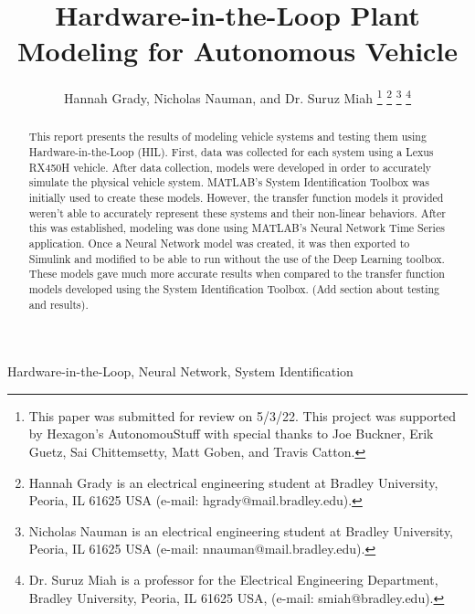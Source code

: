 \documentclass[journal,twoside,web]{ieeecolor}
\begin{document}
\title{Hardware-in-the-Loop Plant Modeling for Autonomous Vehicle}
\author{Hannah Grady, Nicholas Nauman, and Dr. Suruz Miah
\thanks{This paper was submitted for review on 5/3/22. This project was supported by Hexagon's AutonomouStuff with special thanks to Joe Buckner, Erik Guetz, Sai Chittemsetty, Matt Goben, and Travis Catton.}
\thanks{Hannah Grady is an electrical engineering student at Bradley University, Peoria, IL 61625 USA (e-mail: hgrady@mail.bradley.edu).}
\thanks{Nicholas Nauman is an electrical engineering student at Bradley University, Peoria, IL 61625 USA (e-mail: nnauman@mail.bradley.edu).}
\thanks{Dr. Suruz Miah is a professor for the Electrical Engineering Department, Bradley University, Peoria, IL 
61625 USA, (e-mail: smiah@bradley.edu).}
}

\maketitle

\begin{abstract}
This report presents the results of modeling vehicle systems and testing them using Hardware-in-the-Loop (HIL). First, data was collected for each system using a Lexus RX450H vehicle. After data collection, models were developed in order to accurately simulate the physical vehicle system. MATLAB’s System Identification Toolbox was initially used to create these models. However, the transfer function models it provided weren’t able to accurately represent these systems and their non-linear behaviors. After this was established, modeling was done using MATLAB’s Neural Network Time Series application. Once a Neural Network model was created, it was then exported to Simulink and modified to be able to run without the use of the Deep Learning toolbox. These models gave much more accurate results when compared to the transfer function models developed using the System Identification Toolbox. (Add section about testing and results). 
\end{abstract}

\begin{IEEEkeywords}
Hardware-in-the-Loop, Neural Network, System Identification
\end{IEEEkeywords}
\end{document}
